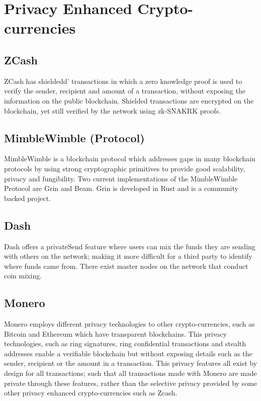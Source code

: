 \section{Privacy Enhanced Crypto-currencies}
\subsection{ZCash}\label{background-zcash}
ZCash has shieldedd' transactions in which a zero knowledge proof is used to verify the sender, recipient and amount of a transaction, without exposing the information on the public blockchain. Shielded transactions are encrypted on the blockchain, yet still verified by the network using zk-SNAKRK proofs. 

\subsection{MimbleWimble (Protocol)}\label{background-mimblewimble}
MimbleWimble is a blockchain protocol which addresses gaps in many blockchain protocols by using strong cryptographic primitives to provide good scalability, privacy and fungibility. Two current implementations of the MimbleWimble Protocol are Grin and Beam. Grin is developed in Rust and is a community backed project. 

\subsection{Dash}
Dash offers a privateSend feature where users can mix the funds they are sending with others on the network; making it more difficult for a third party to identify where funds came from. There exist master nodes on the network that conduct coin mixing. 

\subsection{Monero}\label{background-monero}
Monero employs different privacy technologies to other crypto-currencies, such as Bitcoin and Ethereum which have transparent blockchains. This privacy technologies, such as ring signatures, ring confidential transactions and stealth addresses enable a verifiable blockchain but without exposing details such as the sender, recipient or the amount in a transaction. This privacy features all exist by design for all transactions; such that all transactions made with Monero are made private through these features, rather than the selective privacy provided by some other privacy enhanced crypto-currencies such as Zcash. 

